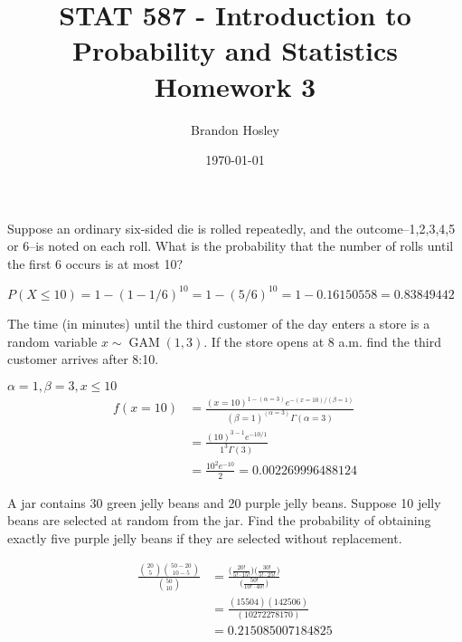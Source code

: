 \documentclass[answers]{exam}
\title{STAT 587 - Introduction to Probability and Statistics%
	\\ Homework 3}
\author{Brandon Hosley}
\date{\today}
\begin{document}
\maketitle
\begin{questions}

\question 
Suppose an ordinary six-sided die is rolled repeatedly, and the outcome--1,2,3,4,5 or 6--is noted on each roll. What is the probability that the number of rolls until the first 6 occurs is at most 10?
\begin{solution}
	\(P(X\leq10) = 1-(1-1/6)^10 = 1-(5/6)^10 = 1-0.16150558 = 0.83849442\)
\end{solution}

\question 
The time (in minutes) until the third customer of the day enters a store is a random variable \(x \sim \operatorname{GAM}(1,3)\). If the store opens at 8 a.m. find the third customer arrives after 8:10.
\begin{solution}
	\(\alpha=1, \beta=3, x \leq 10\)
	\begin{align*}
	f(x=10) 
	&= \frac{(x=10)^{1-(\alpha=3)}e^{-(x=10)/(\beta=1)}}{(\beta=1)^{(\alpha=3)}\Gamma(\alpha=3)} \\
	&= \frac{(10)^{3-1}e^{-10/1}}{1^{3}\Gamma(3)} \\
	&= \frac{10^2e^{-10}}{2} = 0.002269996488124
	\end{align*}
\end{solution}

\question 
A jar contains 30 green jelly beans and 20 purple jelly beans. Suppose 10 jelly beans are selected at random from the jar. Find the probability of obtaining exactly five purple jelly beans if they are selected without replacement.
\begin{solution}
	\begin{align*}
		\frac{\binom{20}{5}\binom{50-20}{10-5}}{\binom{50}{10}}
		&= \frac{\bigg(\frac{20!}{5!\cdot15!}\bigg)\bigg(\frac{30!}{5!\cdot25!}\bigg)}%
				{\bigg(\frac{50!}{10!\cdot40!}\bigg)} \\
		&= \frac{(15504)(142506)}{(10272278170)} \\
		&= 0.215085007184825
	\end{align*}
\end{solution}


\end{questions}
\end{document}
